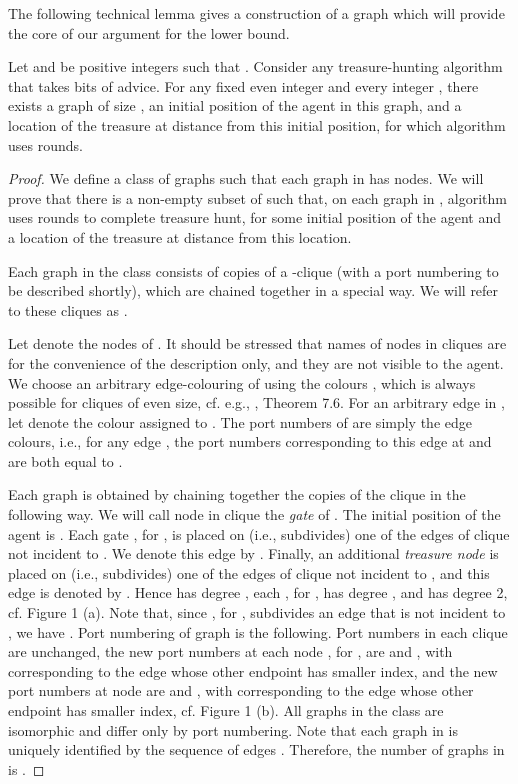 \documentclass{llncs}
\begin{document}
 The following technical lemma gives a construction of a graph which will provide the core of our argument for the  lower bound.


\begin{lemma}\label{lowerboundgraph}
Let  and  be positive integers such that .
Consider any treasure-hunting algorithm  that takes  bits of advice. For any fixed even integer  and every integer , there exists a graph of size , an initial position of the agent in this graph,  and a location of the treasure at distance  from this initial position, for which algorithm  uses  rounds.
\end{lemma}
\begin{proof}
We define a class of graphs  such that each graph in  has  nodes. We will prove that there is a non-empty subset  of  such that, on each graph in , algorithm  uses  rounds to complete treasure hunt, for some initial position of the agent and a location of the 
treasure at distance  from this location. 

Each graph  in the class consists of  copies of a -clique  
(with a port numbering to be described shortly), which are chained together in a special way. We will refer to these cliques as . 

Let  denote the nodes of . It should be stressed that names of nodes in cliques are for the convenience of the description only, and they are not visible to the agent. 
We choose an arbitrary edge-colouring of  using the colours , which is always possible for cliques of even size, cf. e.g., \cite{Gib}, Theorem 7.6. For an arbitrary edge  in , let  denote the colour assigned to . The port numbers of  are simply the edge colours, i.e., for any edge , the port numbers corresponding to this edge at  and  are both equal to . 

Each graph  is obtained by chaining together the copies  of the clique  in the following way. We will call node  in clique  the \emph{gate}  of . The initial position of the agent is . Each gate , for , is placed on (i.e., subdivides) one of the edges of clique  not incident to . We denote this edge by . Finally, an additional \emph{treasure node}  is placed on  (i.e., subdivides) one of the edges of clique  not incident to , and this edge is denoted by .
Hence  has degree , each , for , has degree , and  has degree 2, cf. Figure 1 (a).
Note that, since , for , subdivides an edge that is not incident to , we have .  
Port numbering of graph  is the following. Port numbers in each clique  are
unchanged, the new port numbers at each node , for , are  and , with  corresponding to the edge whose other endpoint has smaller index,
and the new port numbers at node  are  and , with  corresponding to the edge whose other endpoint has smaller index,
cf. Figure 1 (b).
All graphs in the class  are isomorphic and differ only by port numbering. 
Note that each graph in  is uniquely identified by the sequence of edges . Therefore, the number of graphs in  is 
.



\end{proof}
\end{document}
